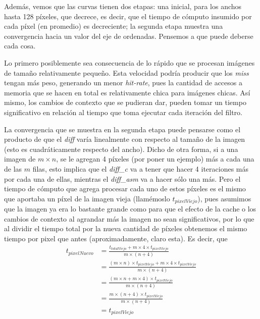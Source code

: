 Además, vemos que las curvas tienen dos etapas: una inicial, para los anchos hasta 128 píxeles, que decrece, es decir, que el tiempo de cómputo insumido por cada píxel (en promedio) es decreciente; la segunda etapa muestra una convergencia hacia un valor del eje de ordenadas. Pensemos a que puede deberse cada cosa.

Lo primero posiblemente sea consecuencia de lo rápido que se procesan imágenes de tamaño relativamente pequeño. Esta velocidad podría producir que los \emph{miss} tengan más peso, generando un menor \emph{hit-rate}, pues la cantidad de accesos a memoria que se hacen en total es relativamente chica para imágenes chicas. Así mismo, los cambios de contexto que se pudieran dar, pueden tomar un tiempo significativo en relación al tiempo que toma ejecutar cada iteración del filtro.

La convergencia que se muestra en la segunda etapa puede pensarse como el producto de que el \emph{diff} varía linealmente con respecto al tamaño de la imagen (esto es cuadráticamente respecto del ancho). Dicho de otra forma, si a una imagen de $m\times n$, se le agregan 4 píxeles (por poner un ejemplo) más a cada una de las $m$ filas, esto implica que el \emph{diff\_c} va a tener que hacer 4 iteraciones más por cada una de ellas, mientras el \emph{diff\_asm} va a hacer sólo una más. Pero el tiempo de cómputo que agrega procesar cada uno de estos píxeles es el mismo que aportaba un píxel de la imagen vieja (llamémoslo $t_{pixelViejo}$), pues asumimos que la imagen ya era lo bastante grande como para que el efecto de la cache o los cambios de contexto al agrandar más la imagen no sean significativos, por lo que al dividir el tiempo total por la nueva cantidad de píxeles obtenemos el mismo tiempo por pixel que antes (aproximadamente, claro esta). Es decir, que 
\begin{equation}
\label{eq:convergencia1}
	\begin{split}
	t_{pixelNuevo} & = \frac{ t_{totalViejo} + m \times 4 \times t_{pixelViejo}}{m\times (n+4)} \\
				   & = \frac{ (m\times n) \times t_{pixelViejo} + m \times 4 \times t_{pixelViejo}}{m\times (n+4)} \\
				   & = \frac{ (m\times n + m \times 4) \times t_{pixelViejo}}{m\times (n+4)} \\
				   & = \frac{ m\times (n + 4) \times t_{pixelViejo}}{m\times (n+4)} \\
				   & = t_{pixelViejo} 
	\end{split}
\end{equation}

